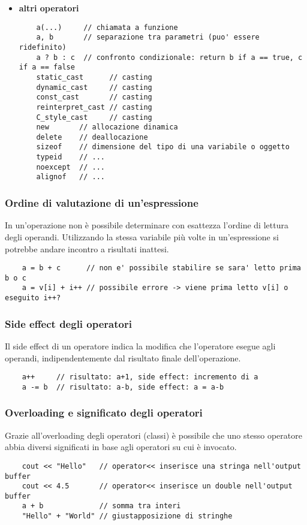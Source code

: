 \documentclass[a4paper]{article}
\begin{document}
\begin{itemize}
\item \textbf{altri operatori}
\begin{lstlisting}
	a(...)     // chiamata a funzione
	a, b       // separazione tra parametri (puo' essere ridefinito)
	a ? b : c  // confronto condizionale: return b if a == true, c if a == false
	static_cast      // casting
	dynamic_cast     // casting
	const_cast       // casting
	reinterpret_cast // casting
	C_style_cast     // casting
	new       // allocazione dinamica
	delete    // deallocazione
	sizeof    // dimensione del tipo di una variabile o oggetto
	typeid    // ...
	noexcept  // ...
	alignof   // ...
\end{lstlisting}
\end{itemize}

\subsubsection*{Ordine di valutazione di un'espressione}
In un'operazione non è possibile determinare con esattezza l'ordine di lettura degli operandi. Utilizzando la stessa variabile
più volte in un'espressione si potrebbe andare incontro a risultati inattesi.
\begin{lstlisting}
	a = b + c      // non e' possibile stabilire se sara' letto prima b o c
	a = v[i] + i++ // possibile errore -> viene prima letto v[i] o eseguito i++?
\end{lstlisting}

\subsubsection*{Side effect degli operatori}
Il side effect di un operatore indica la modifica che l'operatore esegue agli operandi, indipendentemente dal risultato finale
dell'operazione.
\begin{lstlisting}
	a++     // risultato: a+1, side effect: incremento di a
	a -= b  // risultato: a-b, side effect: a = a-b
\end{lstlisting}

\subsubsection*{Overloading e significato degli operatori}
Grazie all'overloading degli operatori (classi) è possibile che uno stesso operatore abbia diversi significati in base agli
operatori su cui è invocato.
\begin{lstlisting}
	cout << "Hello"   // operator<< inserisce una stringa nell'output buffer
	cout << 4.5       // operator<< inserisce un double nell'output buffer
    a + b             // somma tra interi
	"Hello" + "World" // giustapposizione di stringhe
\end{lstlisting}
\end{document}
